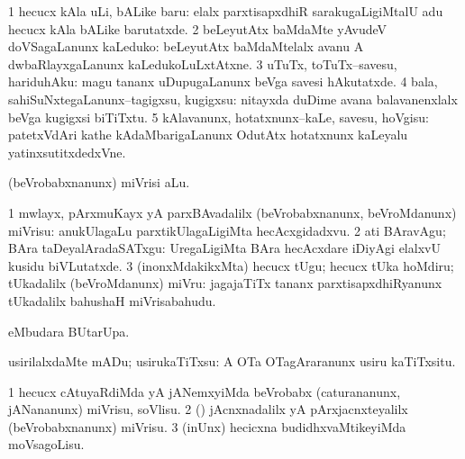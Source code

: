 \bentry
{}
\gl{\sakirx}
\bmng
\bnum
\num{1} hecucx kAla uLi, bALike baru:  elalx parxtisapxdhiR sarakugaLigiMtalU adu hecucx kAla bALike barutatxde. 
\num{2} beLeyutAtx baMdaMte yAvudeV doVSagaLanunx kaLeduko:  beLeyutAtx baMdaMtelalx avanu A dwbaRlayxgaLanunx kaLedukoLuLxtAtxne. 
\num{3} uTuTx, toTuTx--savesu, hariduhAku:  magu tananx uDupugaLanunx beVga savesi hAkutatxde. 
\num{4} bala, sahiSuNxtegaLanunx--tagigxsu, kugigxsu:  nitayxda duDime avana balavanenxlalx beVga kugigxsi biTiTxtu. 
\num{5} kAlavanunx, hotatxnunx--kaLe, savesu, hoVgisu:  patetxVdAri kathe kAdaMbarigaLanunx OdutAtx hotatxnunx kaLeyalu yatinxsutitxdedxVne. 
\enum
\emng
\eentry

\bentry
{}
\gl{\sakirx}
\bmng
(beVrobabxnanunx) miVrisi aLu. 
\emng
\eentry

\bentry
{}
\gl{\sakirx}
\bmng
\bnum
\num{1} mwlayx, pArxmuKayx yA parxBAvadalilx (beVrobabxnanunx, beVroMdanunx) miVrisu:  anukUlagaLu parxtikUlagaLigiMta hecAcxgidadxvu. 
\num{2} ati BAravAgu; BAra taDeyalAradaSATxgu:  UregaLigiMta BAra hecAcxdare iDiyAgi elalxvU kusidu biVLutatxde. 
\num{3} (inonxMdakikxMta) hecucx tUgu; hecucx tUka hoMdiru; tUkadalilx (beVroMdanunx) miVru:  jagajaTiTx tananx parxtisapxdhiRyanunx tUkadalilx bahushaH miVrisabahudu. 
\enum
\emng
\eentry

\bentry
{}
\gl{\kirx}
\bmng
{} eMbudara BUtarUpa. 
\emng
\eentry

\bentry
{}
\gl{\sakirx}
\bmng
usirilalxdaMte mADu; usirukaTiTxsu:  A OTa OTagAraranunx usiru kaTiTxsitu. 
\emng
\eentry

\bentry
{}
\gl{\sakirx}
\bmng
\bnum
\num{1} hecucx cAtuyaRdiMda yA jANemxyiMda beVrobabx (caturananunx, jANananunx) miVrisu, soVlisu. 
\num{2} (\pArxparx) jAcnxnadalilx yA pArxjacnxteyalilx (beVrobabxnanunx) miVrisu. 
\num{3} (inUnx) hecicxna budidhxvaMtikeyiMda moVsagoLisu. 
\enum
\emng
\eentry


